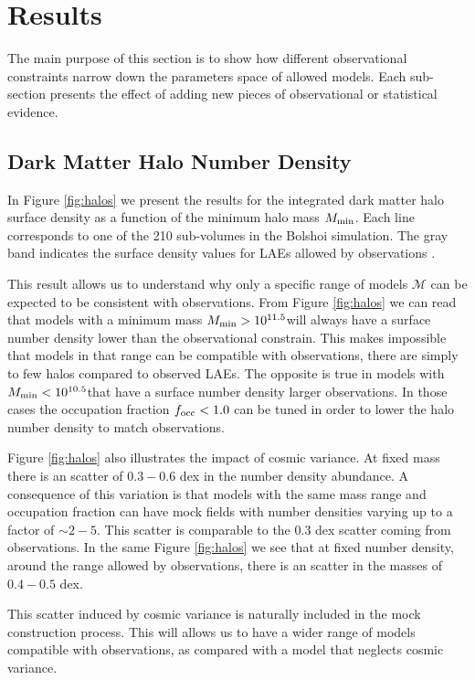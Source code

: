 \documentclass[usenatbib]{mn2e}
\newcommand{\hMsun}{{\ifmmode{h^{-1}{\rm
        {M_{\odot}}}}\else{$h^{-1}{\rm{M_{\odot}}}$}\fi}}
\begin{document}
{ 
\section{Results}
\label{sec:results}

The main purpose of this section is to show how different
observational constraints narrow down the parameters space of allowed
models. Each sub-section presents the effect of adding new pieces of
observational or statistical evidence. 


\subsection{Dark Matter Halo Number Density}

In Figure \ref{fig:halos} we present the results for  the
integrated dark matter halo surface density as a function of the
minimum halo mass $M_{\rm min}$. Each line corresponds to one of the
210 sub-volumes in the Bolshoi simulation. The gray band indicates the
surface density values for LAEs allowed by observations
\citep{Yamada2012}. 
 
This result allows us to understand why only a specific range of
models ${\mathcal M}$ can be expected to be consistent with
observations. From Figure \ref{fig:halos} we can read that models with
a minimum mass $M_{\rm min}>10^{11.5}$\hMsun will always have a
surface number density lower than the observational constrain. This
makes impossible that models in that range can be compatible with
observations, there are simply to few halos compared to observed
LAEs. The opposite is true in models with $M_{\rm
  min}<10^{10.5}$\hMsun that have a surface number density larger
observations. In those cases the occupation fraction $f_{\rm occ}<1.0$
can be tuned in order to lower the halo number density to match
observations.  


Figure \ref{fig:halos} also illustrates the impact of cosmic
variance. At fixed mass there is an scatter of $0.3-0.6$ dex in the
number density abundance.  A consequence of this variation is that
models with the same mass range and occupation fraction can have mock
fields with number densities varying up to a factor of $\sim
2-5$. This scatter is comparable to the $0.3$ dex scatter coming from 
observations. In the same Figure \ref{fig:halos} we see that at fixed
number density, around the range allowed by observations, there is an
scatter in the masses of $0.4-0.5$ dex.  

This scatter induced by cosmic variance is naturally included in the
mock construction process. This will allows us to have a wider range
of models compatible with observations, as compared with a model that
neglects cosmic variance.


}
\end{document}
